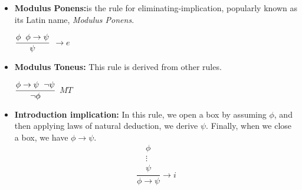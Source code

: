 \documentclass{report}
\begin{document}
\begin{itemize}
        \item{\textbf{Modulus Ponens:}}is the rule for eliminating-implication, popularly known as its Latin name, \textit{Modulus Ponens}.
        \begin{center}
            $\dfrac{\phi \hspace{0.2cm} \phi \to \psi}{\psi}$ $\to e$
        \end{center}
        
        \item{\textbf{Modulus Toneus:}} This rule is derived from other rules.
        \begin{center}
            $\dfrac{\phi \to \psi \hspace{0.2cm} \neg \psi}{\neg \phi}$ $MT$
        \end{center}
        
        \item\textbf{{Introduction implication:}} In this rule, we open a box by assuming $\phi$, and then applying laws of natural deduction, we derive $\psi$. Finally, when we close a box, we have $\phi \to \psi$.
        \\
    
    \[ \frac{
      \boxed{
        \begin{array}{c}
          \phi\\
          \vdots\\
          \psi
        \end{array}
      }
    }{
      \phi \rightarrow \psi
    }
    \rightarrow i
\]
\\
    

\end{itemize}
\end{document}
